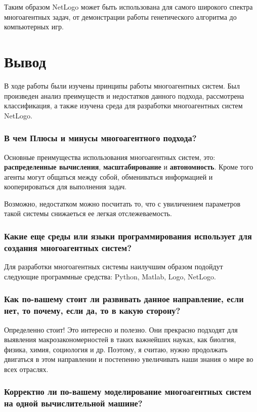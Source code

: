 \documentclass[14pt,a4paper,report]{report}
\begin{document}
Таким образом NetLogo может быть использована для самого широкого спектра многоагентных задач, от демонстрации работы генетического алгоритма до компьютерных игр.

\section{Вывод}

В ходе работы были изучены принципы работы многоагентных систем. Был произведен анализ преимуществ и недостатков данного подхода, рассмотрена классификация, а также изучена среда для разработки многоагентных систем NetLogo.

\subsubsection{В чем Плюсы и минусы многоагентного подхода?}

Основные преимущества использования многоагентных систем, это: \textbf{распределенные вычисления}, \textbf{масштабирование} и \textbf{автономность}. Кроме того агенты могут общаться между собой, обмениваться информацией и кооперироваться для выполнения задач.

Возможно, недостатком можно посчитать то, что с увиличением параметров такой системы снижаеться ее легкая отслежеваемость.

\subsubsection{Какие еще среды или языки программирования использует для создания многоагентных систем?}

Для разработки многоагентных системы наилучшим образом подойдут следующие программные средства: Python, Matlab, Logo, NetLogo.

\subsubsection{Как по-вашему стоит ли развивать данное направление, если нет, то почему, если да, то в какую сторону?}

Определенно стоит! Это интересно и полезно. Они прекрасно подходят для выявления макрозакономерностей в таких важнейших науках, как биолгия, физика, химия, социология и др. Поэтому, я считаю, нужно продолжать двигаться в этом направлении и постепенно увеличивать наши знания о мире во всех отраслях.

\subsubsection{Корректно ли по-вашему моделирование многоагентных систем на одной вычислительной машине?}
\end{document}
